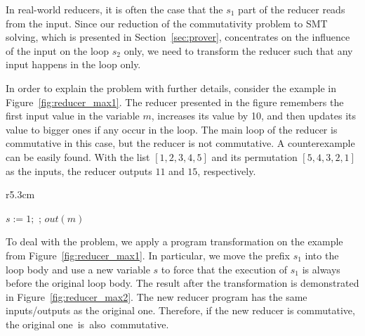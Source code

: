 \documentclass{llncs}
\newcommand{\cur}{cur()}
\begin{document}
In real-world reducers, it is often the case that the $s_1$ part of the reducer
reads from the input. Since our reduction of the commutativity problem to SMT
solving, which is presented in Section~\ref{sec:prover}, concentrates on the
influence of the input on the loop $s_2$ only, we need to transform the reducer
such that any input happens in the loop only. 

In order to explain the problem with further details,
consider the example in Figure~\ref{fig:reducer_max1}. The reducer presented in
the figure remembers the first input value in the variable $m$, increases its
value by 10, and then updates its value to bigger ones if any occur in the loop.
The main loop of the reducer is commutative in this case, but the reducer is not
commutative. A counterexample can be easily found. With the list $[1,2,3,4,5]$
and its permutation $[5,4,3,2,1]$ as the inputs, the reducer outputs $11$ and
$15$, respectively.

\begin{wrapfigure}[12]{r}{5.3cm}
	\vspace{-10mm}
	\begin{algorithm}[H]
		$s:=1;$\;
		\Loop{}{
			\uIf{$s=1$}{$m := \cur + 10; s:= 2$}
			\uElse{
				$t:=\cur$\;
				\uIf{ $t > m$}{
					$m := t$ \;
				}
			}
		};
		$out(m)$
	\end{algorithm}	
	\vspace{-2mm}
	\caption{The max$^{+\mathtt{fix}}$ reducer.}
	\vspace{-4mm}
	\label{fig:reducer_max2}
\end{wrapfigure}

To deal with the problem, we apply a program transformation on the
example from Figure~\ref{fig:reducer_max1}. In particular, we move the prefix
$s_1$ into the loop body and use a new variable $s$ to force that the execution
of $s_1$ is always before the original loop body. The result after the
transformation is demonstrated in Figure~\ref{fig:reducer_max2}. The new reducer
program has the same inputs/outputs as the original one. Therefore, if the new reducer is commutative, the original one~is~also~commutative.

%
\end{document}
